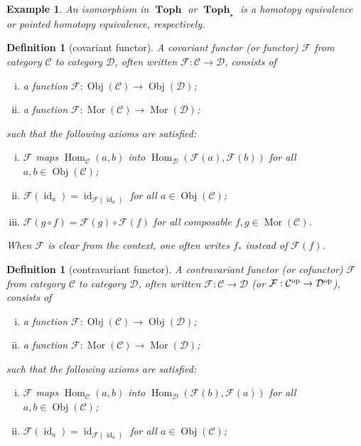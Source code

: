 \documentclass[sort&compress]{elsarticle}
\theoremstyle{theoremstyle}
\theoremstyle{framedtheoremstyle}
\theoremstyle{definitionstyle}
\newtheorem{dfn}[nul]{Definition}%
\theoremstyle{definitionstyle}
\theoremstyle{definitionstyle}
\theoremstyle{definitionstyle}
\newtheorem{exm}[nul]{Example}
\theoremstyle{nameddefinitionstyle}
\theoremstyle{framednameddefinitionstyle}
\theoremstyle{proofstyle}
\theoremstyle{definitionstyle}
\newcommand{\fromto}{\rightarrow}
\newcommand{\C}{\mathcal{C}}
\newcommand{\D}{\mathcal{D}}
\newcommand{\F}{\mathcal{F}}
\DeclareMathOperator{\identity}{id}
\newcommand{\Toph}{\operatorname{\mathbf{Toph}}}
\DeclareMathOperator{\Obj}{Obj}
\DeclareMathOperator{\Mor}{Mor}
\DeclareMathOperator{\Hom}{Hom}
\newcommand{\paren}[1]{\left( #1 \right)}
\begin{document}
\begin{appendices}
\begin{exm}
An isomorphism in $\Toph$ or $\Toph_\star$ is a homotopy equivalence or pointed homotopy equivalence, respectively.
\end{exm}

\begin{dfn}[covariant functor]
A covariant functor (or functor) $\F$ from category $\C$ to category $\D$, often written $\F: \C \fromto \D$, consists of
\begin{enumerate}[(i)]
\item a function $\F: \Obj(\C) \fromto \Obj(\D)$;

\item a function $\F: \Mor(\C) \fromto \Mor(\D)$;
\end{enumerate}
such that the following axioms are satisfied:
\begin{enumerate}[(i)]
\item $\F$ maps $\Hom_{\C}(a,b)$ into $\Hom_{\D}\paren{\F(a),\F(b)}$ for all $a, b\in \Obj(\C)$;

\item $\F(\identity_a) = \identity_{\F(\identity_a)}$ for all $a \in \Obj(\C)$;

\item $\F(g \circ f) = \F(g) \circ \F(f)$ for all composable $f,g\in \Mor(\C)$.
\end{enumerate}
When $\F$ is clear from the context, one often writes $f_\ast$ instead of $\F(f)$.
\end{dfn}

\begin{dfn}[contravariant functor]
A contravariant functor (or cofunctor) $\F$ from category $\C$ to category $\D$, often written $\F: \C \fromto \D$ (or $\F: \C^{\rm op} \fromto \D^{\rm op}$), consists of
\begin{enumerate}[(i)]
\item a function $\F: \Obj(\C) \fromto \Obj(\D)$;

\item a function $\F: \Mor(\C) \fromto \Mor(\D)$;
\end{enumerate}
such that the following axioms are satisfied:
\begin{enumerate}[(i)]
\item $\F$ maps $\Hom_{\C}(a,b)$ into $\Hom_{\D}\paren{\F(b),\F(a)}$ for all $a, b\in \Obj(\C)$;

\item $\F(\identity_a) = \identity_{\F(\identity_a)}$ for all $a \in \Obj(\C)$;


\end{enumerate}
\end{dfn}
\end{appendices}
\end{document}
